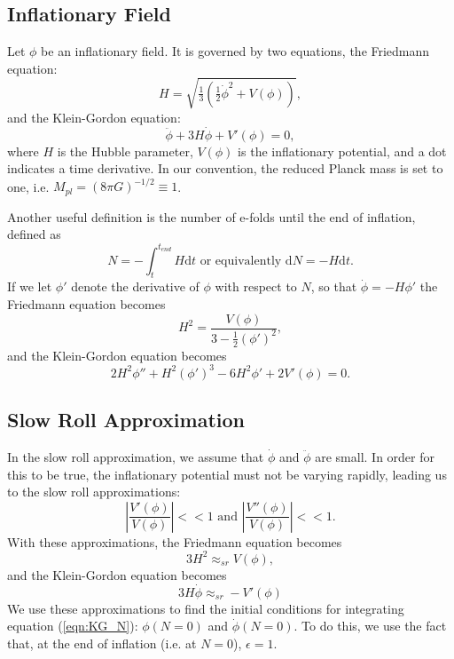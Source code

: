 \documentclass[onecolumn,apj]{emulateapj}
\def\d{\mathrm{d}}
\begin{document}
\subsection{Inflationary Field}
Let $\phi$ be an inflationary field. It is governed by two equations, the Friedmann equation: 
\begin{equation}
H = \sqrt{\tfrac{1}{3} \left ( \tfrac{1}{2} \dot \phi^2 + V(\phi) \right )},
\label{eqn:Friedmann}
\end{equation}
and the Klein-Gordon equation:
\begin{equation}
\ddot \phi + 3H \dot \phi + V'(\phi) = 0,
\label{eqn:KG}
\end{equation}
where $H$ is the Hubble parameter, $V(\phi)$ is the inflationary potential, and a dot indicates a time derivative. In our convention, the reduced Planck mass is set to one, i.e. $M_{pl} = (8\pi G)^{-1/2} \equiv 1$. 

Another useful definition is the number of e-folds until the end of inflation, defined as 
\begin{equation}
N = -\int_t^{t_{end}} H \d t \text{\ \ \ or\ equivalently\ \ \ } \d N = -H \d t. 
\label{eqn:defN}
\end{equation}
If we let $\phi'$ denote the derivative of $\phi$ with respect to $N$, so that $\dot \phi = -H \phi'$ the Friedmann equation becomes
\begin{equation}
H^2 = \frac{V(\phi)}{3 - \tfrac{1}{2}(\phi')^2},
\end{equation}
and the Klein-Gordon equation becomes 
\begin{equation}
2H^2\phi'' + H^2(\phi')^3 - 6H^2\phi' + 2V'(\phi) = 0.
\label{eqn:KG_N}
\end{equation}

\subsection{Slow Roll Approximation}
In the slow roll approximation, we assume that $\dot \phi$ and $\ddot \phi$ are small. In order for this to be true, the inflationary potential must not be varying rapidly, leading us to the slow roll approximations:
\begin{equation}
\left | \frac{V'(\phi)}{V(\phi)} \right | <<1 \text{\ \ \ and\ \ \ } \left | \frac{V''(\phi)}{V(\phi)} \right | <<1 .
\label{eqn:SlowRollApprox}
\end{equation}
With these approximations, the Friedmann equation becomes
\begin{equation}
3 H^2 \approx_{sr} V(\phi),
\label{eqn:Friedmann_sr}
\end{equation}
and the Klein-Gordon equation becomes
\begin{equation}
3 H \dot \phi \approx_{sr} -V'(\phi)
\label{eqn:KG_sr}
\end{equation}
We use these approximations to find the initial conditions for integrating equation (\ref{eqn:KG_N}): $\phi(N=0)$ and $\dot \phi(N=0)$. To do this, we use the fact that, at the end of inflation (i.e. at $N=0$), $\epsilon = 1$. 




{}
\end{document}
